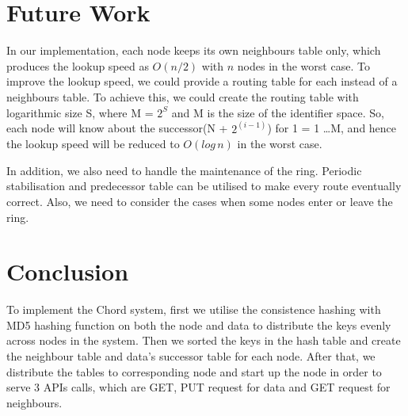 \documentclass[a4paper]{article}
\begin{document}
\section{Future Work}
In our implementation, each node keeps its own neighbours table only, which produces the lookup speed as $O(n/2)$ with $n$ nodes in the worst case. To improve the lookup speed, we could provide a routing table for each instead of a neighbours table. To achieve this, we could create the routing table with logarithmic size S, where M = $2^S$ and M is the size of the identifier space. So, each node will know about the successor(N + $2^{(i-1)}$) for 1 = 1 …M, and hence the lookup speed will be reduced to $O(log\,n)$ in the worst case.

In addition, we also need to handle the maintenance of the ring. Periodic stabilisation and predecessor table can be utilised to make every route eventually correct. Also, we need to consider the cases when some nodes enter or leave the ring.

\section{Conclusion}

To implement the Chord system, first we utilise the consistence hashing with MD5 hashing function on both the node and data to distribute the keys evenly across nodes in the system. Then we sorted the keys in the hash table and create the neighbour table and data’s successor table for each node. After that, we distribute the tables to corresponding node and start up the node in order to serve 3 APIs calls, which are GET, PUT request for data and GET request for neighbours.

\printbibliography
\end{document}
